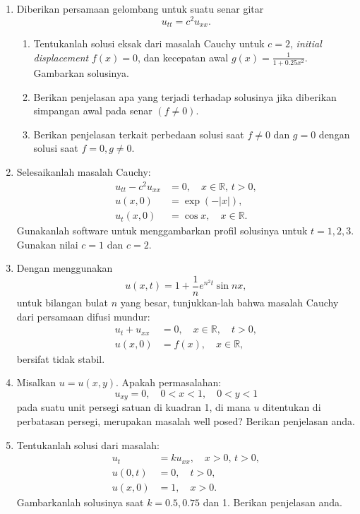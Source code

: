 \documentclass{article}
\begin{document}
\begin{enumerate}
\item  Diberikan persamaan gelombang untuk suatu senar gitar  
\[
u_{tt} = c^2 u_{xx}.
\]  
\begin{enumerate}
\item Tentukanlah solusi eksak dari masalah Cauchy untuk \( c = 2 \), \textit{initial displacement} \( f(x) = 0 \), dan kecepatan awal \( g(x) = \frac{1}{1+0.25x^2} \). Gambarkan solusinya.  
\item Berikan penjelasan apa yang terjadi terhadap solusinya jika diberikan simpangan awal pada senar \( (f \neq 0) \).  
\item Berikan penjelasan terkait perbedaan solusi saat \( f \neq 0 \) dan \( g = 0 \) dengan solusi saat \( f = 0, g \neq 0 \).  
\end{enumerate}

\item Selesaikanlah masalah Cauchy:  
\begin{align*}
u_{tt} - c^2 u_{xx} &= 0, \quad x \in \mathbb{R}, \, t > 0, \\
u(x, 0) &= \exp(-|x|), \\
u_t(x, 0) &= \cos x, \quad x \in \mathbb{R}.
\end{align*}  
Gunakanlah software untuk menggambarkan profil solusinya untuk \( t = 1, 2, 3 \). Gunakan nilai \( c = 1 \) dan \( c = 2 \).  

\item Dengan menggunakan  
\[
u(x, t) = 1 + \frac{1}{n} e^{n^2 t} \sin nx,
\]  
untuk bilangan bulat \( n \) yang besar, tunjukkan-lah bahwa masalah Cauchy dari persamaan difusi mundur:  
\begin{align*}
u_t + u_{xx} &= 0, \quad x \in \mathbb{R}, \quad t > 0, \\
u(x, 0) &= f(x), \quad x \in \mathbb{R},
\end{align*}  
bersifat tidak stabil.

\item Misalkan \( u = u(x, y) \). Apakah permasalahan:  
\[
u_{xy} = 0, \quad 0 < x < 1, \quad 0 < y < 1
\]  
pada suatu unit persegi satuan di kuadran 1, di mana \( u \) ditentukan di perbatasan persegi, merupakan masalah well posed? Berikan penjelasan anda.

\item Tentukanlah solusi dari masalah:  
\begin{align*}
u_t &= k u_{xx}, \quad x > 0, \, t > 0, \\
u(0, t) &= 0, \quad t > 0, \\
u(x, 0) &= 1, \quad x > 0.
\end{align*}  
Gambarkanlah solusinya saat \( k = 0.5, 0.75 \) dan 1. Berikan penjelasan anda.


\end{enumerate}
\end{document}
